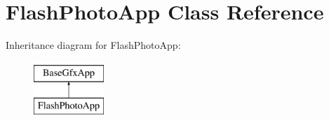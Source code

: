 \hypertarget{classFlashPhotoApp}{\section{Flash\-Photo\-App Class Reference}
\label{classFlashPhotoApp}
}
Inheritance diagram for Flash\-Photo\-App\-:\begin{figure}[H]
\begin{center}
\leavevmode
\includegraphics[height=2.000000cm]{classFlashPhotoApp}
\end{center}
\end{figure}
